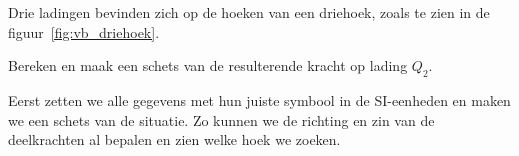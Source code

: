 \documentclass{ximera}
\begin{document}
\begin{example}[foldable=true,title={Voorbeeld: drie ladingen niet op een lijn}]\label{vb:driehoek}\nl
    Drie ladingen bevinden zich op de hoeken van een driehoek, zoals te zien in de figuur~\ref{fig:vb_driehoek}.            
    
        \begin{center}
            \label{fig:vb_driehoek}
        \end{center}
    
    Bereken en maak een schets van de resulterende kracht op lading $Q_{2}$. 

    \begin{solution}\nl
        Eerst zetten we alle gegevens met hun juiste symbool in de SI-eenheden en maken we een schets van de situatie. Zo kunnen we de richting en zin van de deelkrachten al bepalen en zien welke hoek we zoeken.\\[1ex]
        

\end{solution}
\end{example}
\end{document}
